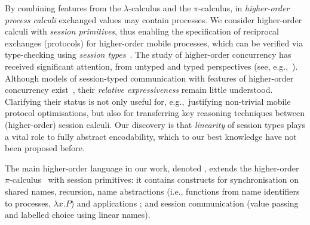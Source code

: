 By combining features from the $\lambda$-calculus and the $\pi$-calculus, 
in \emph{higher-order process calculi} exchanged values may contain  processes. 
We consider higher-order calculi with \emph{session primitives},
thus enabling the specification of reciprocal exchanges (protocols) 
for higher-order mobile processes, 
which can be verified via type-checking using \emph{session types}~\cite{honda.vasconcelos.kubo:language-primitives}.
The study of higher-order concurrency has received significant attention, 
from untyped and typed perspectives (see, e.g.,~\cite{ThomsenB:plachoasgcfhop,SangiorgiD:expmpa,San96int,MostrousY15,DBLP:journals/iandc/LanesePSS11,DBLP:conf/icalp/LanesePSS10,DBLP:conf/esop/KoutavasH11,XuActa2012}).
Although models of session-typed 
communication with features of higher-order concurrency exist~\cite{tlca07,DBLP:journals/jfp/GayV10},
their \emph{relative expressiveness}
remain little understood. 
Clarifying their status is not only useful for, 
e.g.,~justifying non-trivial mobile protocol
optimisations, but also for transferring key reasoning techniques
between (higher-order) session calculi. Our discovery 
is that \emph{linearity} of session types plays a vital role to fully abstract encodability, 
which to our best knowledge have not been proposed before.   

The main higher-order language in our work, denoted \HOp,
extends the higher-order $\pi$-calculus~\cite{SangiorgiD:expmpa} with session primitives:
it contains constructs for 
synchronisation on shared names, 
recursion, 
name abstractions (i.e., functions from name identifiers  to processes, 
$\lambda x.P$) and applications 
;
and session communication (value passing and
labelled choice using linear names). 

